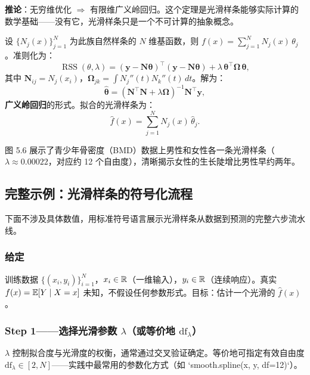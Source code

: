 \textbf{推论}：无穷维优化 $\Rightarrow$ 有限维广义岭回归。这个定理是光滑样条能够实际计算的数学基础——没有它，光滑样条只是一个不可计算的抽象概念。

设 $\{N_j(x)\}_{j=1}^{N}$ 为此族自然样条的 $N$ 维基函数，则 $f(x) = \sum_{j=1}^{N} N_j(x)\,\theta_j$。准则化为：
\begin{equation}\label{eq:smoothing_spline_ridge}
    \operatorname{RSS}(\theta, \lambda) = (\mathbf{y} - \mathbf{N}\boldsymbol{\theta})^\top (\mathbf{y} - \mathbf{N}\boldsymbol{\theta})
    + \lambda \,\boldsymbol{\theta}^\top \boldsymbol{\Omega}\,\boldsymbol{\theta},
\end{equation}
其中 $\mathbf{N}_{ij} = N_j(x_i)$，$\boldsymbol{\Omega}_{jk} = \int N_j''(t) N_k''(t)\,dt$。解为：
\begin{equation}\label{eq:smoothing_spline_solution}
    \hat{\boldsymbol{\theta}} = (\mathbf{N}^\top\mathbf{N} + \lambda\boldsymbol{\Omega})^{-1} \mathbf{N}^\top \mathbf{y},
\end{equation}
\textbf{广义岭回归}的形式。拟合的光滑样条为：
\[
\hat{f}(x) = \sum_{j=1}^{N} N_j(x)\,\hat{\theta}_j.
\]

图 5.6 展示了青少年骨密度（BMD）数据上男性和女性各一条光滑样条（$\lambda \approx 0.00022$，对应约 12 个自由度），清晰揭示女性的生长陡增比男性早约两年。

\subsection{完整示例：光滑样条的符号化流程}

下面不涉及具体数值，用标准符号语言展示光滑样条从数据到预测的完整六步流水线。

\subsubsection{给定}

训练数据 $\{(x_i, y_i)\}_{i=1}^{N}$，$x_i \in \mathbb{R}$（一维输入），$y_i \in \mathbb{R}$（连续响应）。真实 $f(x) = \mathbb{E}[Y\mid X=x]$ 未知，不假设任何参数形式。目标：估计一个光滑的 $\hat{f}(x)$。

\subsubsection{Step 1——选择光滑参数 $\lambda$（或等价地 $\mathrm{df}_\lambda$）}

$\lambda$ 控制拟合度与光滑度的权衡，通常通过交叉验证确定。等价地可指定有效自由度 $\mathrm{df}_\lambda \in [2, N]$——实践中最常用的参数化方式（如 `smooth.spline(x, y, df=12)`）。

